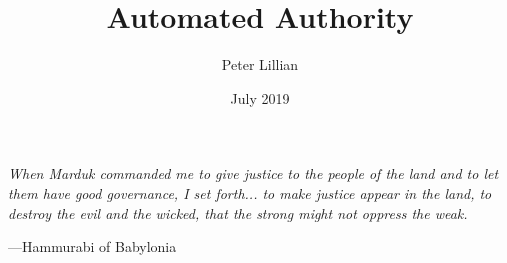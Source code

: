 \documentclass[12pt]{article}
\title{Automated Authority \\[-6pt]
}
\author{\vspace{-\baselineskip}Peter Lillian}
\date{\vspace{-\baselineskip}July 2019}
\newenvironment{quote_1in}%
  {\list{}{\leftmargin=1in\rightmargin=1in}\item[]}%
  {\endlist}
\begin{document}
\frenchspacing

\maketitle



\begin{quote_1in}
    \textit{When Marduk commanded me to give justice to the people of the land and to let them have good governance, I set forth... to make justice appear in the land, to destroy the evil and the wicked, that the strong might not oppress the weak.}
    
    ---Hammurabi of Babylonia \cite{driver2007babylonian}
\end{quote_1in}
\end{document}
